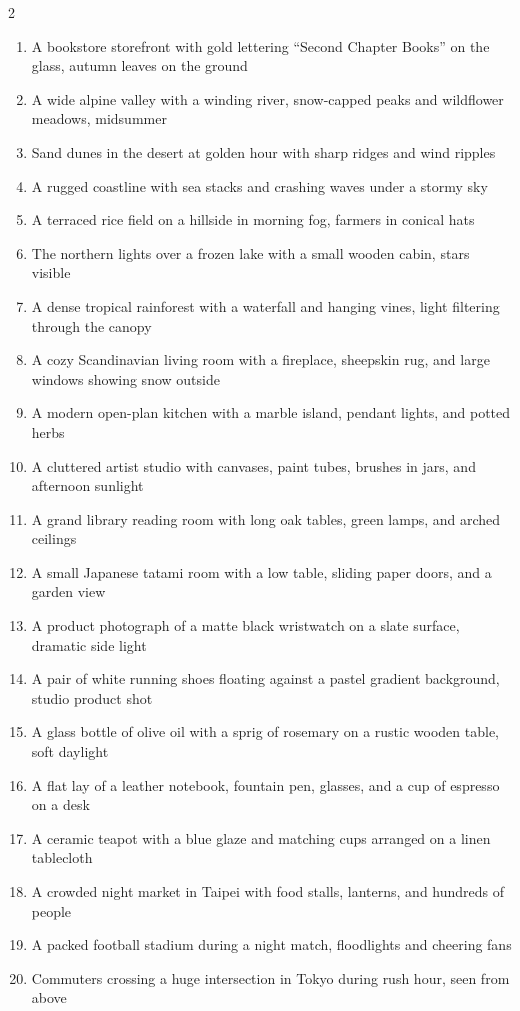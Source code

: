 {\begin{multicols}{2}
\begin{enumerate}[leftmargin=2.1em,itemsep=0pt,topsep=0pt,parsep=0pt]
  \item A bookstore storefront with gold lettering ``Second Chapter Books'' on the glass, autumn leaves on the ground
  \item A wide alpine valley with a winding river, snow-capped peaks and wildflower meadows, midsummer
  \item Sand dunes in the desert at golden hour with sharp ridges and wind ripples
  \item A rugged coastline with sea stacks and crashing waves under a stormy sky
  \item A terraced rice field on a hillside in morning fog, farmers in conical hats
  \item The northern lights over a frozen lake with a small wooden cabin, stars visible
  \item A dense tropical rainforest with a waterfall and hanging vines, light filtering through the canopy
  \item A cozy Scandinavian living room with a fireplace, sheepskin rug, and large windows showing snow outside
  \item A modern open-plan kitchen with a marble island, pendant lights, and potted herbs
  \item A cluttered artist studio with canvases, paint tubes, brushes in jars, and afternoon sunlight
  \item A grand library reading room with long oak tables, green lamps, and arched ceilings
  \item A small Japanese tatami room with a low table, sliding paper doors, and a garden view
  \item A product photograph of a matte black wristwatch on a slate surface, dramatic side light
  \item A pair of white running shoes floating against a pastel gradient background, studio product shot
  \item A glass bottle of olive oil with a sprig of rosemary on a rustic wooden table, soft daylight
  \item A flat lay of a leather notebook, fountain pen, glasses, and a cup of espresso on a desk
  \item A ceramic teapot with a blue glaze and matching cups arranged on a linen tablecloth
  \item A crowded night market in Taipei with food stalls, lanterns, and hundreds of people
  \item A packed football stadium during a night match, floodlights and cheering fans
  \item Commuters crossing a huge intersection in Tokyo during rush hour, seen from above

\end{enumerate}
\end{multicols}}

